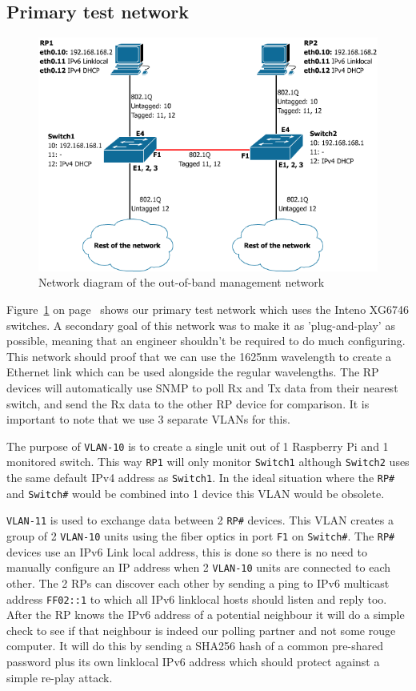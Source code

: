 \documentclass{article}
\begin{document}
\subsection{Primary test network}
\begin{figure}[h]
\centerline{\includegraphics[scale=0.4]{images/PoC_all.png}}
\caption{Network diagram of the out-of-band management network}
\label{fig:poc_all}
\end{figure}

Figure~\ref{fig:poc_all} on page~\pageref{fig:poc_all} shows our primary test network which uses the Inteno XG6746 switches. A secondary goal of this network was to make it as 'plug-and-play' as possible, meaning that an engineer shouldn't be required to do much configuring. This network should proof that we can use the 1625nm wavelength to create a Ethernet link which can be used alongside the regular wavelengths. The RP devices will automatically use SNMP to poll Rx and Tx data from their nearest switch, and send the Rx data to the other RP device for comparison. It is important to note that we use 3 separate VLANs for this. 

The purpose of \texttt{VLAN-10} is to create a single unit out of 1 Raspberry Pi and 1 monitored switch. This way \texttt{RP1} will only monitor \texttt{Switch1} although \texttt{Switch2} uses the same default IPv4 address as \texttt{Switch1}. In the ideal situation where the \texttt{RP\#} and \texttt{Switch\#} would be combined into 1 device this VLAN would be obsolete.

\texttt{VLAN-11} is used to exchange data between 2 \texttt{RP\#} devices. This VLAN creates a group of 2 \texttt{VLAN-10} units using the fiber optics in port \texttt{F1} on \texttt{Switch\#}. The \texttt{RP\#} devices use an IPv6 Link local address, this is done so there is no need to manually configure an IP address when 2 \texttt{VLAN-10} units are connected to each other. The 2 RPs can discover each other by sending a ping to IPv6 multicast address \texttt{FF02::1} to which all IPv6 linklocal hosts should listen and reply too\cite{ietf:rfc4291}. After the RP knows the IPv6 address of a potential neighbour it will do a simple check to see if that neighbour is indeed our polling partner and not some rouge computer. It will do this by sending a SHA256 hash of a common pre-shared password plus its own linklocal IPv6 address which should protect against a simple re-play attack.
\end{document}
